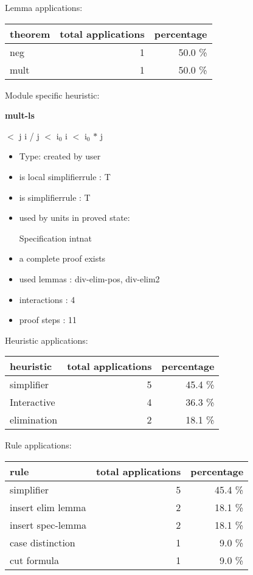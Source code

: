 \documentclass[a4paper]{article}
\begin{document}
Lemma applications:

\begin{supertabular}{l|r|r}
theorem	        & total applications & percentage \\ \hline
neg & 1 & 50.0 \% \\
mult & 1 & 50.0 \% \\

\end{supertabular}

Module specific heuristic:

\pagebreak

{\LARGE\bf mult-ls}\label{lemma-mult-ls}

\medskip

  $<$ j \And i / j $<$ $\mbox{i}_{0}$ \Imp i $<$ $\mbox{i}_{0}$ $*$ j

\begin{itemize}

\item Type: created by user

\item is local simplifierrule : T
\item is simplifierrule : T
\item used by units in proved state:

Specification intnat
\item       a complete proof exists
\item       used lemmas  : div-elim-pos, div-elim2
\item       interactions : 4
\item       proof steps  : 11
\end{itemize}

\medskip


Heuristic applications:

\begin{supertabular}{l|r|r}
heuristic	& total applications & percentage \\ \hline
simplifier & 5 & 45.4 \% \\
Interactive & 4 & 36.3 \% \\
elimination & 2 & 18.1 \% \\

\end{supertabular}

Rule applications:

\begin{supertabular}{l|r|r}
rule	        & total applications & percentage \\ \hline
simplifier & 5 & 45.4 \% \\
insert elim lemma & 2 & 18.1 \% \\
insert spec-lemma & 2 & 18.1 \% \\
case distinction & 1 & 9.0 \% \\
cut formula & 1 & 9.0 \% \\

\end{supertabular}
\end{document}
